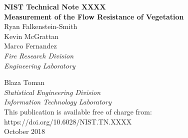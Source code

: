 \documentclass[12pt]{article}
\newcommand{\pubnumber}{XXXX}
\newcommand{\DOI}{https://doi.org/10.6028/NIST.TN.XXXX}
\newcommand{\monthyear}{October 2018}
\begin{document}
\newpage

\hspace{5in}

\newpage

\begin{titlepage}
\begin{flushright}
\LARGE{\textbf{NIST Technical Note \pubnumber}}\\
\vfill
\Huge{\textbf{Measurement of the Flow Resistance of Vegetation}}\\
\vfill
\normalsize Ryan Falkenstein-Smith\\
Kevin McGrattan\\
Marco Fernandez\\
\textit{Fire Research Division}\\
\textit{Engineering Laboratory}\\
\vspace{12pt}

\normalsize Blaza Toman\\
\textit{Statistical Engineering Division}\\
\textit{Information Technology Laboratory}\\
\vspace{12pt}
\vfill
\normalsize This publication is available free of charge from:\\
\DOI\\
\vfill
\normalsize \monthyear
\vfill


\end{flushright}
\end{titlepage}
\end{document}
